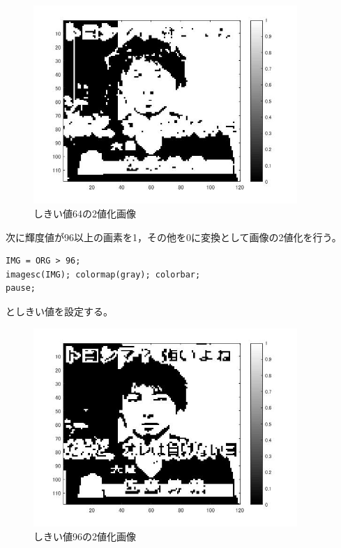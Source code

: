 \documentclass{jsarticle}
\begin{document}
\begin{figure}[htbp]
 \begin{center}
  \includegraphics[width=10cm]{kadai3-1.jpg}
 \end{center}
 \caption{しきい値64の2値化画像}
\end{figure}

次に輝度値が96以上の画素を1，その他を0に変換として画像の2値化を行う。
\begin{lstlisting}[basicstyle=\ttfamily\footnotesize, frame=single]
IMG = ORG > 96;
imagesc(IMG); colormap(gray); colorbar;
pause;
\end{lstlisting}
としきい値を設定する。

\begin{figure}[htbp]
 \begin{center}
  \includegraphics[width=10cm]{kadai3-2.jpg}
 \end{center}
 \caption{しきい値96の2値化画像}
\end{figure}
\end{document}
